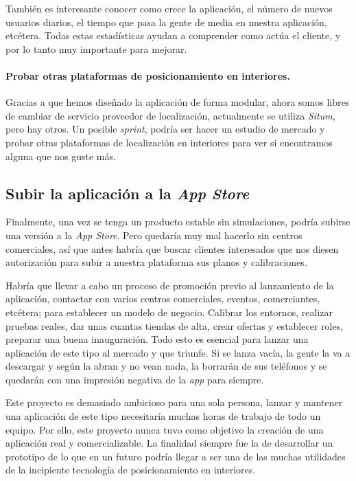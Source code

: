 También es interesante conocer como crece la aplicación, el número de nuevos usuarios diarios, el tiempo que pasa la gente de media en nuestra aplicación, etcétera. Todas estas estadísticas ayudan a comprender como actúa el cliente, y por lo tanto muy importante para mejorar.

\paragraph{Probar otras plataformas de posicionamiento en interiores.}
Gracias a que hemos diseñado la aplicación de forma modular, ahora somos libres de cambiar de servicio proveedor de localización, actualmente se utiliza \textit{Situm}, pero hay otros. Un posible \textit{sprint}, podría ser hacer un estudio de mercado y probar otras plataformas de localización en interiores para ver si encontramos alguna que nos guste más.

\subsection{Subir la aplicación a la \textit{App Store}}
Finalmente, una vez se tenga un producto estable sin simulaciones, podría subirse una versión a la \textit{App Store}. Pero quedaría muy mal hacerlo sin centros comerciales, así que antes habría que buscar clientes interesados que nos diesen autorización para subir a nuestra plataforma sus planos y calibraciones.

Habría que llevar a cabo un proceso de promoción previo al lanzamiento de la aplicación, contactar con varios centros comerciales, eventos, comerciantes, etcétera; para establecer un modelo de negocio. Calibrar los entornos, realizar pruebas reales, dar unas cuantas tiendas de alta, crear ofertas y establecer roles, preparar una buena inauguración. Todo esto es esencial para lanzar una aplicación de este tipo al mercado y que triunfe. Si se lanza vacía, la gente la va a descargar y según la abran y no vean nada, la borrarán de sus teléfonos y se quedarán con una impresión negativa de la \textit{app} para siempre.

Este proyecto es demasiado ambicioso para una sola persona, lanzar y mantener una aplicación de este tipo necesitaría muchas horas de trabajo de todo un equipo. Por ello, este proyecto nunca tuvo como objetivo la creación de una aplicación real y comercializable. La finalidad siempre fue la de desarrollar un prototipo de lo que en un futuro podría llegar a ser una de las muchas utilidades de la incipiente tecnología de posicionamiento en interiores.